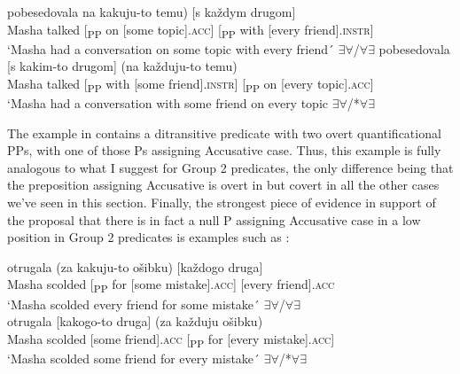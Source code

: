 \documentclass[output=paper,colorlinks,citecolor=brown]{./langscibook}
\begin{document}
\ea%
    \label{ex:antonyuk:53}
    \ea \label{ex:antonyuk:53a}
      {pobesedovala} {} {na} {kakuju-to} {temu)}         {}    [s       {každym} {drugom]}\\
    Masha talked     [\textsubscript{PP}  on [some      topic].\textsc{acc}] [\textsubscript{PP} with [every friend].\textsc{instr}]\\
    \glt `Masha had a conversation on some topic with every friend´ \hfill ${\exists}{\forall}$/${\forall}{\exists}$
    \ex \label{ex:antonyuk:53b}
      {pobesedovala} {} {[s}       {kakim-to} {drugom]} {}           {(na} {každuju-to} {temu)}\\
    Masha talked         [\textsubscript{PP} with [some      friend].\textsc{instr}] [\textsubscript{PP} on [every topic].\textsc{acc}]\\
    \glt `Masha had a conversation with some friend on every topic \hfill ${\exists}{\forall}$/*${\forall}{\exists}$
    \z
\z

The example in  contains a ditransitive predicate with two overt quantificational PPs, with one of those Ps assigning Accusative case. Thus, this example is fully analogous to what I suggest for Group 2 predicates, the only difference being that the preposition assigning Accusative is overt in  but covert in all the other cases we’ve seen in this section. Finally, the strongest piece of evidence in support of the proposal that there is in fact a null P assigning Accusative case in a low position in Group 2 predicates is examples such as :

\ea%
    \label{ex:antonyuk:54}
    \ea \label{ex:antonyuk:54a}
       {otrugala}  {}  {(za}  {kakuju-to} {ošibku)}          {[každogo} {druga]}\\
    Masha scolded [\textsubscript{PP} for [some       mistake].\textsc{acc}] [every    friend].\textsc{acc~}\\
    \glt `Masha scolded every friend for some mistake´ \hfill ${\exists}{\forall}$/${\forall}{\exists}$\\
    \ex \label{ex:antonyuk:54b}
       {otrugala} {[kakogo-to} {druga]}    {}        {(za}  {každuju}  {ošibku)}\\
    Masha scolded  [some         friend].\textsc{acc} [\textsubscript{PP} for [every     mistake].\textsc{acc}]\\
    \glt `Masha scolded some friend for every mistake´ \hfill ${\exists}{\forall}$/*${\forall}{\exists}$
    \z
\z
\end{document}

